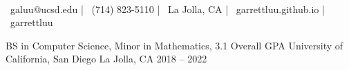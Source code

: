 \documentclass[]{awesome-cv}
\begin{document}
\begin{center}
	\vspace{-5mm}
	  \\
	\vspace{2mm}
  {\faEnvelope\ galuu@ucsd.edu} | {\faMobile\ (714) 823-5110} |
  {\faMapMarker\ La Jolla, CA} | {\faLink\ garrettluu.github.io} |
  {\faLinkedinSquare\ garrettluu}
\end{center}
\vspace{-3mm}
\begin{cventries}
	\cventry
	{BS in Computer Science, Minor in Mathematics, 3.1 Overall GPA}
	{University of California, San Diego}
	{La Jolla, CA}
	{2018 – 2022}
	{}
\end{cventries}
\end{document}
